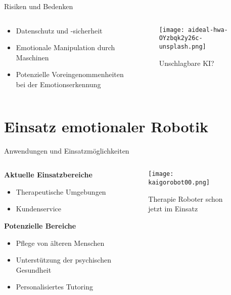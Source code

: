 \documentclass[aspectratio=169]{beamer}
\begin{document}
\begin{frame}{Risiken und Bedenken}
  \begin{columns}
    \begin{column}{0.6\textwidth}
      \begin{itemize}
        \item Datenschutz und -sicherheit
        \item Emotionale Manipulation durch Maschinen
        \item Potenzielle Voreingenommenheiten bei der Emotionserkennung
      \end{itemize}
    \end{column}
    \begin{column}{0.4\textwidth}
      \begin{figure}[h]
        \centering
        \texttt{[image: aideal-hwa-OYzbqk2y26c-unsplash.png]}
        \caption{Unschlagbare KI?}
      \end{figure}
    \end{column}
  \end{columns}
\end{frame}

\section{Einsatz emotionaler Robotik}
\begin{frame}{Anwendungen und Einsatzmöglichkeiten}
  \begin{columns}
    \begin{column}{0.6\textwidth}
      \textbf{Aktuelle Einsatzbereiche}
      \begin{itemize}
        \item Therapeutische Umgebungen
        \item Kundenservice
      \end{itemize}
      \vspace{1cm}

      \textbf{Potenzielle Bereiche}
      \begin{itemize}
        \item Pflege von älteren Menschen
        \item Unterstützung der psychischen Gesundheit
        \item Personalisiertes Tutoring
      \end{itemize}
    \end{column}
    \begin{column}{0.4\textwidth}
      \begin{figure}[h]
        \centering
        \texttt{[image: kaigorobot00.png]}
        \caption{Therapie Roboter schon jetzt im Einsatz}
      \end{figure}
    \end{column}
  \end{columns}
\end{frame}
\end{document}
